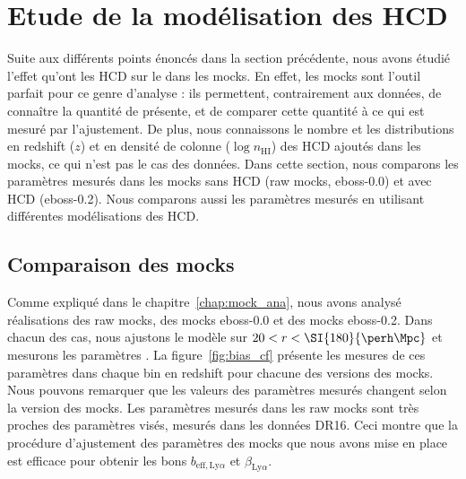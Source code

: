 \section{Etude de la modélisation des HCD}
\label{sec:etude_model_hcd}
Suite aux différents points énoncés dans la section précédente, nous avons étudié l'effet qu'ont les HCD sur le \lya{} dans les mocks.
En effet, les mocks sont l'outil parfait pour ce genre d'analyse : ils permettent, contrairement aux données, de connaître la quantité de \lya{} présente, et de comparer cette quantité à ce qui est mesuré par l'ajustement. De plus, nous connaissons le nombre et les distributions en redshift ($z$) et en densité de colonne ($\log n_{\mathrm{HI}}$) des HCD ajoutés dans les mocks, ce qui n'est pas le cas des données.
Dans cette section, nous comparons les paramètres \lya{} mesurés dans les mocks sans HCD (raw mocks, eboss-0.0) et avec HCD (eboss-0.2). Nous comparons aussi les paramètres \lya{} mesurés en utilisant différentes modélisations des HCD.

\subsection{Comparaison des mocks}
\label{subsec:comparaison_mocks}
Comme expliqué dans le chapitre~\ref{chap:mock_ana}, nous avons analysé \Nmocks{} réalisations des raw mocks, des mocks eboss-0.0 et des mocks eboss-0.2.
Dans chacun des cas, nous ajustons le modèle sur $20 < r < \SI{180}{\perh\Mpc}$ et mesurons les paramètres \lya{}.
La figure~\ref{fig:bias_cf} présente les mesures de ces paramètres dans chaque bin en redshift pour chacune des versions des mocks.
Nous pouvons remarquer que les valeurs des paramètres \lya{} mesurés changent selon la version des mocks.
Les paramètres mesurés dans les raw mocks sont très proches des paramètres visés, mesurés dans les données DR16. Ceci montre que la procédure d'ajustement des paramètres des mocks que nous avons mise en place est efficace pour obtenir les bons $b_{\mathrm{eff},\mathrm{Ly}\alpha}$ et $\beta_{\mathrm{Ly}\alpha}$.

